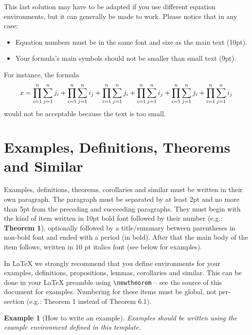 \documentclass{article}
\newtheorem{example}{Example}
\begin{document}
This last solution may have to be adapted if you use different equation environments, but it can generally be made to work. Please notice that in any case:

\begin{itemize}
	\item Equation numbers must be in the same font and size as the main text (10pt).
	\item Your formula's main symbols should not be smaller than {\small small} text (9pt).
\end{itemize}

For instance, the formula
%
\begin{equation}
	\resizebox{.91\linewidth}{!}{$
			\displaystyle
			x = \prod_{i=1}^n \sum_{j=1}^n j_i + \prod_{i=1}^n \sum_{j=1}^n i_j + \prod_{i=1}^n \sum_{j=1}^n j_i + \prod_{i=1}^n \sum_{j=1}^n i_j + \prod_{i=1}^n \sum_{j=1}^n j_i + \prod_{i=1}^n \sum_{j=1}^n i_j
		$}
\end{equation}
%
would not be acceptable because the text is too small.

\section{Examples, Definitions, Theorems and Similar}

Examples, definitions, theorems, corollaries and similar must be written in their own paragraph. The paragraph must be separated by at least 2pt and no more than 5pt from the preceding and succeeding paragraphs. They must begin with the kind of item written in 10pt bold font followed by their number (e.g.: {\bf Theorem 1}),
optionally followed by a title/summary between parentheses in non-bold font and ended with a period (in bold).
After that the main body of the item follows, written in 10 pt italics font (see below for examples).

In \LaTeX{} we strongly recommend that you define environments for your examples, definitions, propositions, lemmas, corollaries and similar. This can be done in your \LaTeX{} preamble using \texttt{\textbackslash{newtheorem}} -- see the source of this document for examples. Numbering for these items must be global, not per-section (e.g.: Theorem 1 instead of Theorem 6.1).

\begin{example}[How to write an example]
	Examples should be written using the example environment defined in this template.
\end{example}
\end{document}
